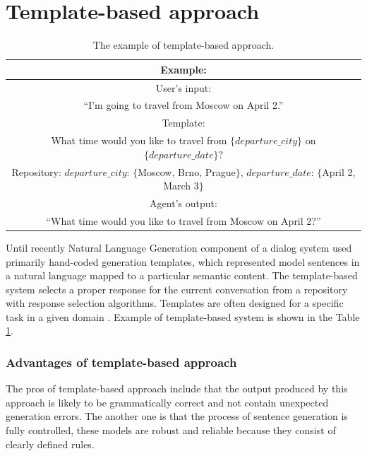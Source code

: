 \section{Template-based approach} 

\begin{table}[ht]
\centering
 \begin{tabular}{|c|} 
 \hline
 Example: \\
 \hline
 User's input: \\
 ``I'm going to travel from Moscow on April 2.'' \\ 
 \hline
 Template: \\
 What time would you like to travel from $\{departure\_city\}$ on $\{departure\_date\}?$ \\
 Repository: $departure\_city$: $\{$Moscow, Brno, Prague$\}$, $departure\_date$: $\{$April 2, March 3$\}$ \\
 \hline
 Agent's output:\\
 ``What time would you like to travel from Moscow on April 2?'' \\
 \hline
 \end{tabular}
 \caption{The example of template-based approach.}
\label{tab:tb_example}
\end{table}

Until recently Natural Language Generation component of a dialog system used primarily hand-coded generation templates, which represented model sentences in a natural language mapped to a particular semantic content.
The template-based system selects a proper response for the current conversation from a repository with response selection algorithms. Templates are often designed for a specific task in a given domain \cite{manishina2016data}. 
Example of template-based system is shown in the Table \ref{tab:tb_example}.

\subsubsection{Advantages of template-based approach}
The pros of template-based approach include that the output produced by this approach is likely to be grammatically correct and not contain unexpected generation errors. The another one is that the process of sentence generation is fully controlled, these models are robust and reliable because they consist of clearly defined rules. 

